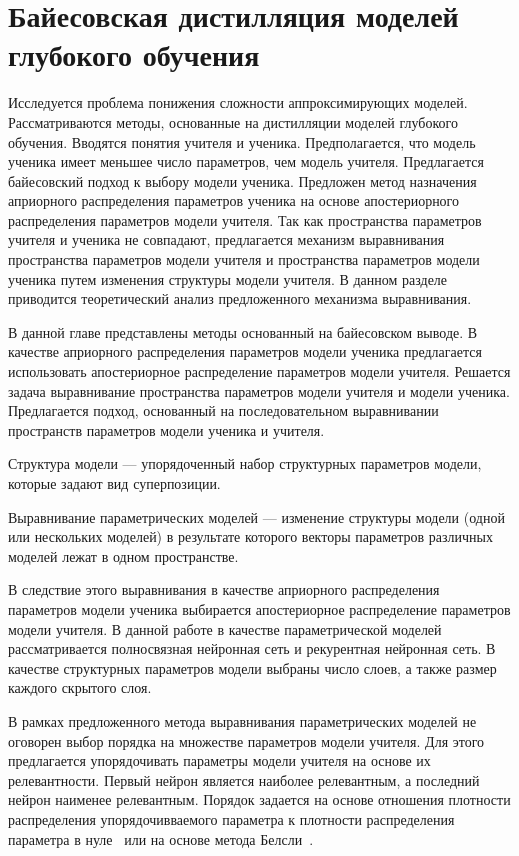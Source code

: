 \chapter{Байесовская дистилляция моделей глубокого обучения}
Исследуется проблема понижения сложности аппроксимирующих моделей. 
Рассматриваются методы, основанные на дистилляции моделей глубокого обучения. 
Вводятся понятия учителя и ученика. Предполагается, что модель ученика имеет меньшее число параметров, чем модель учителя. 
Предлагается байесовский подход к выбору модели ученика. 
Предложен метод назначения априорного распределения параметров ученика на основе апостериорного распределения параметров модели учителя. 
Так как пространства параметров учителя и ученика не совпадают, предлагается механизм выравнивания пространства параметров модели учителя и пространства параметров модели ученика путем изменения структуры модели учителя.
В данном разделе приводится теоретический анализ предложенного механизма выравнивания.

В данной главе представлены методы основанный на байесовском выводе.
В качестве априорного распределения параметров модели ученика предлагается использовать апостериорное распределение параметров модели учителя.
Решается задача выравнивание пространства параметров модели учителя и модели ученика.
Предлагается подход, основанный на последовательном выравнивании пространств параметров модели ученика и учителя. 
\begin{definition}
\label{def:structure}
Структура модели --- упорядоченный набор структурных параметров модели, которые задают вид суперпозиции.
\end{definition}
\begin{definition}
\label{def:sopos}
Выравнивание параметрических моделей --- изменение структуры модели (одной или нескольких моделей) в результате которого векторы параметров различных моделей лежат в одном пространстве.
\end{definition}
В следствие этого выравнивания в качестве априорного распределения параметров модели ученика выбирается апостериорное распределение параметров модели учителя.
В данной работе в качестве параметрической моделей рассматривается полносвязная нейронная сеть и рекурентная нейронная сеть.
В качестве структурных параметров модели выбраны число слоев, а также размер каждого скрытого слоя.

В рамках предложенного метода выравнивания параметрических моделей не оговорен выбор порядка на множестве параметров модели учителя.
Для этого предлагается упорядочивать параметры модели учителя на основе их релевантности.
Первый нейрон является наиболее релевантным, а последний нейрон наименее релевантным.
Порядок задается на основе отношения плотности распределения упорядочивваемого параметра к плотности распределения параметра в нуле~\cite{graves2011} или на основе метода Белсли~\cite{grabovoy2019}.

